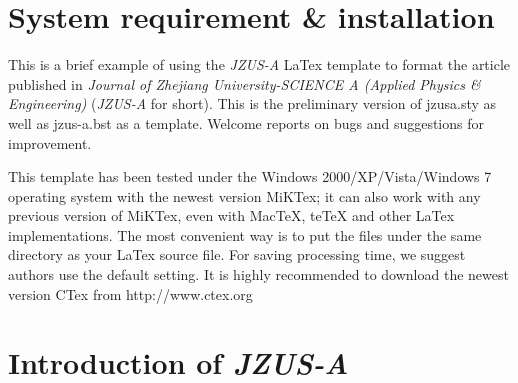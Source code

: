 \documentclass[twoside,twocolumn]{article}
\begin{document}

\articleType{}


\maketitle

\section{System requirement \& installation}\label{sec:introduction}
  This is a brief example of using the \emph{JZUS-A} LaTex template to format the article published in \emph{Journal of Zhejiang University-SCIENCE A (Applied Physics {\sf \slshape \&} Engineering)} (\emph{JZUS-A} for short). This is the preliminary version of jzusa.sty as well as jzus-a.bst as a template. Welcome reports on bugs and suggestions for improvement.

  This template has been tested under the Windows 2000/XP/Vista/Windows 7 operating system with the newest version MiKTex; it can also work with any previous version of MiKTex, even with MacTeX, teTeX and other LaTex implementations. The most convenient way is to put the files under the same directory as your LaTex source file. For saving processing time, we suggest authors use the default setting. It is highly recommended to download the newest version CTex from http://www.ctex.org

\section{Introduction of \emph{JZUS-A}}
\end{document}
